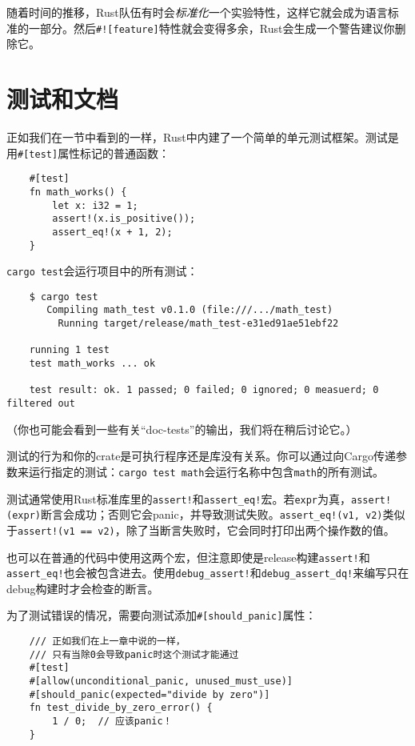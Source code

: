 随着时间的推移，Rust队伍有时会\emph{标准化}一个实验特性，这样它就会成为语言标准的一部分。然后\texttt{\#![feature]}特性就会变得多余，Rust会生成一个警告建议你删除它。

\section{测试和文档}

正如我们在一节中看到的一样，Rust中内建了一个简单的单元测试框架。测试是用\texttt{\#[test]}属性标记的普通函数：
\begin{verbatim}
    #[test]
    fn math_works() {
        let x: i32 = 1;
        assert!(x.is_positive());
        assert_eq!(x + 1, 2);
    }
\end{verbatim}

\texttt{cargo test}会运行项目中的所有测试：
\begin{verbatim}
    $ cargo test
       Compiling math_test v0.1.0 (file:///.../math_test)
         Running target/release/math_test-e31ed91ae51ebf22
    
    running 1 test
    test math_works ... ok

    test result: ok. 1 passed; 0 failed; 0 ignored; 0 measuerd; 0 filtered out
\end{verbatim}
（你也可能会看到一些有关“doc-tests”的输出，我们将在稍后讨论它。）

测试的行为和你的crate是可执行程序还是库没有关系。你可以通过向Cargo传递参数来运行指定的测试：\texttt{cargo test math}会运行名称中包含\texttt{math}的所有测试。

测试通常使用Rust标准库里的\texttt{assert!}和\texttt{assert\_eq!}宏。若\texttt{expr}为真，\texttt{assert!(expr)}断言会成功；否则它会panic，并导致测试失败。\texttt{assert\_eq!(v1, v2)}类似于\texttt{assert!(v1 == v2)}，除了当断言失败时，它会同时打印出两个操作数的值。

也可以在普通的代码中使用这两个宏，但注意即使是release构建\texttt{assert!}和\texttt{assert\_eq!}也会被包含进去。使用\texttt{debug\_assert!}和\texttt{debug\_assert\_dq!}来编写只在debug构建时才会检查的断言。

为了测试错误的情况，需要向测试添加\texttt{\#[should\_panic]}属性：
\begin{verbatim}
    /// 正如我们在上一章中说的一样，
    /// 只有当除0会导致panic时这个测试才能通过
    #[test]
    #[allow(unconditional_panic, unused_must_use)]
    #[should_panic(expected="divide by zero")]
    fn test_divide_by_zero_error() {
        1 / 0;  // 应该panic！
    }
\end{verbatim}

